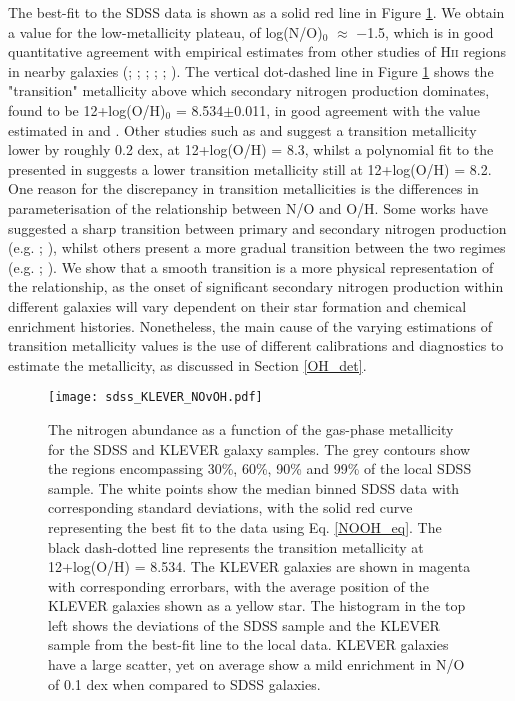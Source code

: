 \documentclass[usenatbib]{mnras} %
\begin{document}
The best-fit to the SDSS data is shown as a solid red line in Figure \ref{fig:SDSS_KLEVER_NOOH}. We obtain a value for the low-metallicity plateau, of log(N/O)$_0$ $\approx$ $-$1.5, which is in good quantitative agreement with empirical estimates from other studies of \textsc{Hii} regions in nearby galaxies (\citealt{VilaCostas_1993}; \citealt{vanZee_1998}; \citealt{HenryWorthy_1999}; \citealt{PMC_2009}; \citealt{Pilyugin_2012}; \citealt{AndrewsMartini_2013}). The vertical dot-dashed line in Figure \ref{fig:SDSS_KLEVER_NOOH} shows the "transition" metallicity above which secondary nitrogen production dominates, found to be 12+log(O/H)$_0$ = 8.534$\pm$0.011, in good agreement with the value estimated in \cite{vanZee_1998} and \cite{AndrewsMartini_2013}. Other studies such as \cite{Shields_1991} and \cite{HenryWorthy_1999} suggest a transition metallicity lower by roughly 0.2 dex, at 12+log(O/H) = 8.3, whilst a polynomial fit to the \cite{Pilyugin_2012} presented in \cite{Steidel_2014} suggests a lower transition metallicity still at 12+log(O/H) = 8.2. One reason for the discrepancy in transition metallicities is the differences in parameterisation of the relationship between N/O and O/H. Some works have suggested a sharp transition between primary and secondary nitrogen production (e.g. \citealt{Charlot_2001}; \citealt{AndrewsMartini_2013}), whilst others present a more gradual transition between the two regimes (e.g. \citealt{vanZee_1998}; \citealt{Pilyugin_2012}). We show that a smooth transition is a more physical representation of the relationship, as the onset of significant secondary nitrogen production within different galaxies will vary dependent on their star formation and chemical enrichment histories. Nonetheless, the main cause of the varying estimations of transition metallicity values is the use of different calibrations and diagnostics to estimate the metallicity, as discussed in Section \ref{OH_det}.

\begin{figure}
\texttt{[image: sdss\_KLEVER\_NOvOH.pdf]}
\caption{The nitrogen abundance as a function of the gas-phase metallicity for the SDSS and KLEVER galaxy samples. The grey contours show the regions encompassing 30\%, 60\%, 90\% and 99\% of the local SDSS sample. The white points show the median binned SDSS data with corresponding standard deviations, with the solid red curve representing the best fit to the data using Eq. \ref{NOOH_eq}. The black dash-dotted line represents the transition metallicity at 12+log(O/H) = 8.534. The KLEVER galaxies are shown in magenta with corresponding errorbars, with the average position of the KLEVER galaxies shown as a yellow star. The histogram in the top left shows the deviations of the SDSS sample and the KLEVER sample from the best-fit line to the local data. KLEVER galaxies have a large scatter, yet on average show a mild enrichment in N/O of 0.1 dex when compared to SDSS galaxies.}
\label{fig:SDSS_KLEVER_NOOH}
\end{figure}
\end{document}
